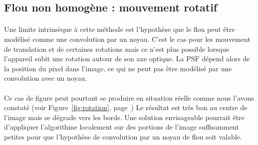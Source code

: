 \documentclass[a4paper,10pt]{report}
\begin{document}
\subsection{Flou non homogène : mouvement rotatif}
\paragraph{}
Une limite intrinsèque à cette méthode est l'hypothèse que le flou peut être modélisé comme une convolution
par un noyau. C'est le cas pour les mouvement de translation et de certaines rotations mais ce n'est plus possible 
lorsque l'appareil subit une rotation autour de son axe optique. La PSF dépend alors de la position du pixel dans l'image, 
ce qui ne peut pas être modélisé par une convolution avec un noyau.
\paragraph{}
Ce cas de figure peut pourtant se produire en situation réelle comme nous l'avons constaté 
(voir Figure~\ref{fig:rotation}, page~\pageref{fig:rotation})
Le résultat est très bon au centre de l'image mais se dégrade vers les bords. Une solution envisageable pourrait être
d'appliquer l'algorithme localement sur des portions de l'image suffisamment petites pour que 
l'hypothèse de convolution par un noyau de flou soit valable.
\end{document}
